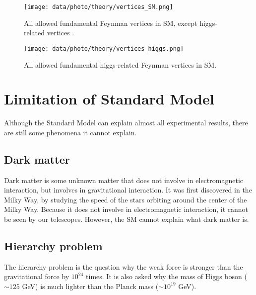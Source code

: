 \begin{figure}
\centering
\texttt{[image: data/photo/theory/vertices\_SM.png]}
\caption{All allowed fundamental Feynman vertices in SM, except higgs-related vertices \cite{vertices_SM}.}
\label{fig:vertices_SM}
\end{figure}

\begin{figure}
\centering
\texttt{[image: data/photo/theory/vertices\_higgs.png]}
\caption{All allowed fundamental higgs-related Feynman vertices in SM.}
\label{fig:vertices_higgs}
\end{figure}

\section{Limitation of Standard Model}
\label{sec:Limitation_Standard_Model}
Although the Standard Model can explain almost all experimental results, there are still some phenomena it cannot explain.

\subsection{Dark matter}
\label{sec:dark_matter}
Dark matter is some unknown matter that does not involve in electromagnetic interaction, but involves in gravitational interaction.
It was first discovered in the Milky Way, by studying the speed of the stars orbiting around the center of the Milky Way.
Because it does not involve in electromagnetic interaction, it cannot be seen by our telescopes.
However, the SM cannot explain what dark matter is.

\subsection{Hierarchy problem}
\label{subsec:hierarchy_problem}
The hierarchy problem is the question why the weak force is stronger than the gravitational force by $10^{24}$ times.
It is also asked why the mass of Higgs boson ($\sim 125$ GeV) is much lighter than the Planck mass ($\sim 10^{19}$ GeV).


